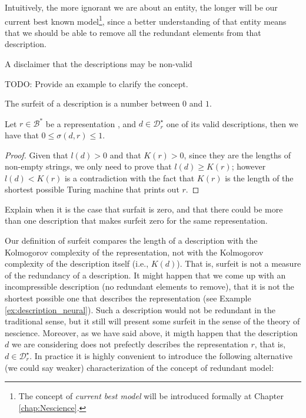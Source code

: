 Intuitively, the more ignorant we are about an entity, the longer will be our current best known model\footnote{The concept of \emph{current best model} will be introduced formally at Chapter \ref{chap:Nescience}.}, since a better understanding of that entity means that we should be able to remove all the redundant elements from that description.

{\color{red} A disclaimer that the descriptions may be non-valid}

\begin{example}
{\color{red} TODO: Provide an example to clarify the concept.}
\end{example}

The surfeit of a description is a number between $0$ and $1$.

\begin{proposition}
\label{prop:range_redundancy}
Let $r \in \mathcal{B}^\ast$ be a representation , and $d \in \mathcal{D}^\star_r$ one of its valid descriptions, then we have that $0 \leq \sigma(d, r) \leq 1$.
\end{proposition}
\begin{proof}
Given that $l\left( d \right)>0$ and that $K\left( r \right)>0$, since they are the lengths of non-empty strings, we only need to prove that $l\left( d \right) \geq K\left( r \right)$; however $l\left( d \right) < K\left( r \right)$ is a contradiction with the fact that $K\left( r \right)$ is the length of the shortest possible Turing machine that prints out $r$.
\end{proof}

{\color{red} Explain when it is the case that surfait is zero, and that there could be more than one description that makes surfeit zero for the same representation.}

Our definition of surfeit compares the length of a description with the Kolmogorov complexity of the representation, not with the Kolmogorov complexity of the description itself (i.e., $K\left( d \right)$). That is, surfeit is not a measure of the redundancy of a description. It might happen that we come up with an incompressible description (no redundant elements to remove), that it is not the shortest possible one that describes the representation (see Example \ref{ex:description_neural}). Such a description would not be redundant in the traditional sense, but it still will present some surfeit in the sense of the theory of nescience. Moreover, as we have said above, it migth happen that the description $d$ we are considering does not prefectly describes the representation $r$, that is, $d \in \mathcal{D}^\star_r$. In practice it is highly convenient to introduce the following alternative (we could say weaker) characterization of the concept of redundant model:

